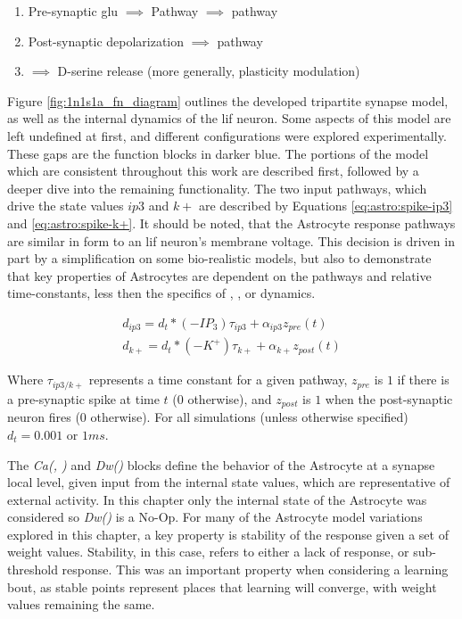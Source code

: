 \begin{enumerate}
  \item Pre-synaptic \Gls{glu} $\implies$ \ipt Pathway $\implies$ \ca pathway
  \item Post-synaptic depolarization \kp $\implies$ \ca pathway
  \item \ca $\implies$ D-serine release (more generally, plasticity modulation)
\end{enumerate}


Figure \ref{fig:1n1s1a_fn_diagram} outlines the developed tripartite synapse
model, as well as the internal dynamics of the \Gls{lif} neuron. Some aspects of this
model are left undefined at first, and different configurations were explored
experimentally. These gaps are the function blocks in darker blue. The
portions of the model which are consistent throughout this work are described
first, followed by a deeper dive into the remaining functionality. The two input
pathways, which drive the state values $ip3$ and $k+$ are described by Equations
\ref{eq:astro:spike-ip3} and \ref{eq:astro:spike-k+}. It should be noted, that
the Astrocyte response pathways are similar in form to an \Gls{lif} neuron's membrane
voltage. This decision is driven in part by a simplification on some
bio-realistic models, but also to demonstrate that key properties of Astrocytes
are dependent on the pathways and relative time-constants, less then the specifics of
\ca, \ipt, or \kp dynamics.

\begin{align}
  d_{ip3} = d_t * (-IP_3)\tau_{ip3} + \alpha_{ip3} z_{pre}(t) \label{eq:astro:spike-ip3} \\
  d_{k+} = d_t * (-K^+)\tau_{k+} + \alpha_{k+} z_{post}(t) \label{eq:astro:spike-k+}
\end{align}

Where $\tau_{ip3/k+}$ represents a time constant for a given pathway, $z_{pre}$
is $1$ if there is a pre-synaptic spike at time $t$ ($0$ otherwise), and
$z_{post}$ is $1$ when the post-synaptic neuron fires ($0$ otherwise). For all
simulations (unless otherwise specified) $d_t = 0.001$ or $1ms$.

The \emph{Ca(\ipt, \kp)} and \emph{Dw(\ca)} blocks define the behavior
of the Astrocyte at a synapse local level, given input from the internal state values,
which are representative of external activity. In this chapter only the internal
state of the Astrocyte was considered so \emph{Dw(\ca)} is a
No-Op. For many of the Astrocyte model variations explored in this chapter, a
key property is stability of the response given a set of weight
values. Stability, in this case, refers to either a lack of \ca response, or
sub-threshold \ca response. This was an important property when considering
a learning bout, as stable points represent places that learning will converge,
with weight values remaining the same.

